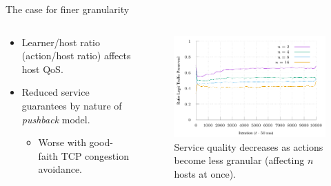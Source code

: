 \documentclass[aspectratio=169,xcolor={dvipsnames}
,hide notes
]{beamer}
\begin{document}
\begin{frame}{The case for finer granularity}
	\begin{columns}
	\begin{column}{0.45\linewidth}
		\begin{itemize}
			\item Learner/host ratio (action/host ratio) affects host QoS.
			
			\item Reduced service guarantees by nature of \emph{pushback} model.
			\begin{itemize}
				\item \alert{Worse with good-faith TCP congestion avoidance}.
			\end{itemize}
			
		\end{itemize}
	\end{column}
	\begin{column}{0.5\linewidth}
		\begin{figure}
			\includegraphics[width=\linewidth]{../plots/online-varyN-binary.pdf}
			\caption{Service quality decreases as actions become less granular (affecting $n$ hosts at once).}
		\end{figure}
	\end{column}
	\end{columns}
\end{frame}
\end{document}
